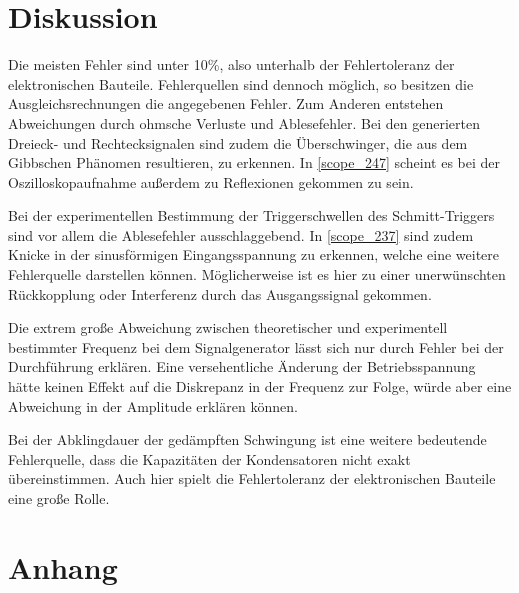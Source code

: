 \section{Diskussion}
Die meisten Fehler sind unter 10\%, also unterhalb der Fehlertoleranz der elektronischen Bauteile. Fehlerquellen sind dennoch möglich, so besitzen die Ausgleichsrechnungen die angegebenen Fehler. Zum Anderen entstehen Abweichungen durch ohmsche Verluste und Ablesefehler. Bei den generierten Dreieck- und Rechtecksignalen sind zudem die Überschwinger, die aus dem Gibbschen Phänomen resultieren, zu erkennen. In \autoref{scope_247} scheint es bei der Oszilloskopaufnahme außerdem zu Reflexionen gekommen zu sein.\par
Bei der experimentellen Bestimmung der Triggerschwellen des Schmitt-Triggers sind vor allem die Ablesefehler ausschlaggebend. In \autoref{scope_237} sind zudem Knicke in der sinusförmigen Eingangsspannung zu erkennen, welche eine weitere Fehlerquelle darstellen können. Möglicherweise ist es hier zu einer unerwünschten Rückkopplung oder Interferenz durch das Ausgangssignal gekommen.\par
Die extrem große Abweichung zwischen theoretischer und experimentell bestimmter Frequenz bei dem Signalgenerator lässt sich nur durch Fehler bei der Durchführung erklären. Eine versehentliche Änderung der Betriebsspannung hätte keinen Effekt auf die Diskrepanz in der Frequenz zur Folge, würde aber eine Abweichung in der Amplitude erklären können.\par
Bei der Abklingdauer der gedämpften Schwingung ist eine weitere bedeutende Fehlerquelle, dass die Kapazitäten der Kondensatoren nicht exakt übereinstimmen. Auch hier spielt die Fehlertoleranz der elektronischen Bauteile eine große Rolle.

\printbibliography

\FloatBarrier

\section{Anhang}







